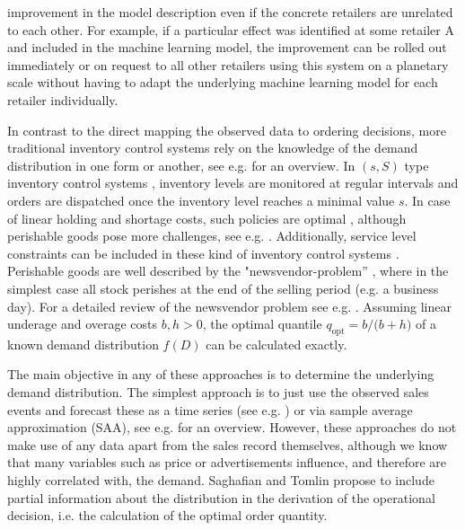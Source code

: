\documentclass[BCOR=1mm, DIV=calc,10pt,
twoside=true,
twocolumn,
headings=normal]{scrartcl}
\begin{document}
improvement in the model description even if the concrete retailers are unrelated to each other. For example, if a particular effect was identified at some retailer A and included in the machine learning model, the improvement can be rolled out immediately or on request to all other retailers using this system on a planetary scale without having to adapt the underlying machine learning model for each retailer individually.

In contrast to the direct mapping the observed data to ordering decisions, more traditional inventory control systems rely on the knowledge of the demand distribution in one form or another, see e.g. \cite{silver1998} for an overview. In $(s,S)$ type inventory control systems \cite{Scarf1958}, inventory levels are monitored at regular intervals and orders are dispatched once the inventory level reaches a minimal value $s$. In case of linear holding and shortage costs, such policies are optimal \cite{Scarf1959}, although perishable goods pose more challenges, see e.g. \cite{Nahmias1973,Nahmias1975,nahmias1978}. Additionally, service level constraints can be included in these kind of inventory control systems \cite{minner2010periodic}. Perishable goods are well described by the "newsvendor-problem'' \cite{Edgeworth}, where in the simplest case all stock perishes at the end of the selling period (e.g. a business day). For a detailed review of the newsvendor problem see e.g. \cite{Khouja1999537}. Assuming linear underage and overage costs $b,h >0$, the optimal quantile $q_{\mathrm{opt}} = {b}/{(b+h})$ of a known demand distribution $f(D)$ can be calculated exactly.

The main objective in any of these approaches is to determine the underlying demand distribution. The simplest approach is to just use the observed sales events and forecast these as a time series (see e.g. \cite{alwan2016}) or via sample average approximation (SAA), see e.g. \cite{shapiro2014} for an overview. However, these approaches do not make use of any data apart from the sales record themselves, although we know that many variables such as price or advertisements influence, and therefore are highly correlated with, the demand. Saghafian and Tomlin \cite{saghafian2016newsvendor} propose to include partial information about the distribution in the derivation of the operational decision, i.e. the  calculation of the optimal order quantity.
\end{document}
